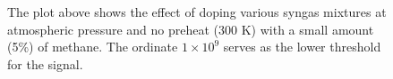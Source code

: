 \begin{figure}

\centering



\caption[Syngas-alkane-air flame results - I]{The plot above shows the effect of doping various syngas mixtures at atmospheric pressure and no preheat (300 K) with a small amount (5\%) of methane. The ordinate \(1\times10^9\) serves as the lower threshold for the signal.}

\label{fig:syngas-300}

\end{figure}

